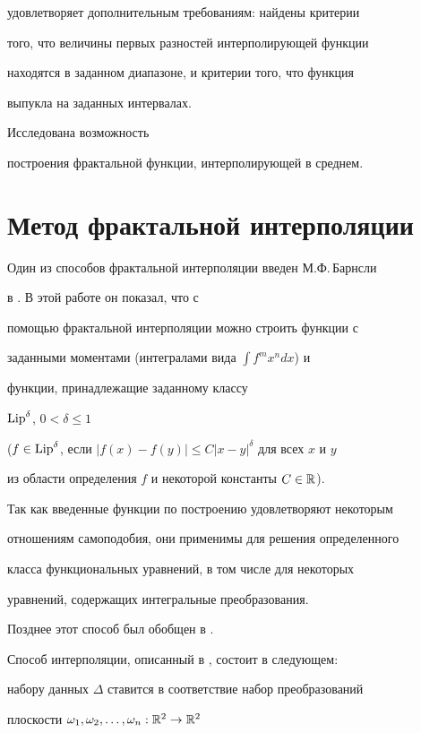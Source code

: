 удовлетворяет дополнительным требованиям: найдены критерии


того, что величины первых разностей интерполирующей функции


находятся в заданном диапазоне, и критерии того, что функция


выпукла на заданных интервалах.


Исследована возможность


построения фрактальной функции, интерполирующей в среднем.





\section{Метод фрактальной интерполяции}





Один из способов фрактальной интерполяции введен М.Ф.\,Барнсли


в \cite{barnsley1}. В этой работе он показал, что с


помощью фрактальной интерполяции можно строить функции с


заданными моментами (интегралами вида $\int f^m x^n dx$) и


функции, принадлежащие заданному классу


$\operatorname{Lip}^\delta$, $0 < \delta \le 1$


($f \in \operatorname{Lip}^\delta$, если $|f(x)-f(y)|\le C|x-y|^\delta $ для всех $x$ и $y$


из области определения $f$ и некоторой константы $C \in {\Bbb R}$).


Так как введенные функции по построению удовлетворяют некоторым


отношениям самоподобия, они применимы для решения определенного


класса функциональных уравнений, в том числе для некоторых


уравнений, содержащих интегральные преобразования.


Позднее этот способ был обобщен в \cite{recbar}.





Способ интерполяции, описанный в \cite{barnsley1}, состоит в следующем:


набору данных $\Delta$ ставится в соответствие набор преобразований


плоскости $\omega_1,\omega_2,\dotsc,\omega_n:{{\Bbb R}}^2\to{{\Bbb R}}^2$


